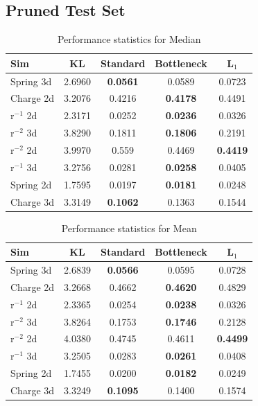 \documentclass[11pt]{article}
\begin{document}
\subsection{Pruned Test Set}
\begin{table}[h]
    \centering
    \begin{tabular}{lcccc}
    \hline
    Sim & KL & Standard & Bottleneck & L$_{1}$ \\
    \hline
    Spring 3d & 2.6960 & \textbf{0.0561} & 0.0589 & 0.0723 \\
    Charge 2d & 3.2076 & 0.4216 & \textbf{0.4178} & 0.4491 \\
    r$^{-1}$ 2d & 2.3171 & 0.0252 & \textbf{0.0236} & 0.0326 \\
    r$^{-2}$ 3d & 3.8290 & 0.1811 & \textbf{0.1806} & 0.2191 \\
    r$^{-2}$ 2d & 3.9970 & 0.559 & 0.4469 & \textbf{0.4419} \\
    r$^{-1}$ 3d & 3.2756 & 0.0281 & \textbf{0.0258} & 0.0405 \\
    Spring 2d & 1.7595 & 0.0197 & \textbf{0.0181} & 0.0248 \\
    Charge 3d & 3.3149 & \textbf{0.1062} & 0.1363 & 0.1544 \\
    \hline
    \end{tabular}
    \caption{Performance statistics for Median}
    \label{tab:Median}
    \end{table}

    \begin{table}[h]
        \centering
        \begin{tabular}{lcccc}
        \hline
        Sim & KL & Standard & Bottleneck & L$_{1}$ \\
        \hline
        Spring 3d & 2.6839 & \textbf{0.0566} & 0.0595 & 0.0728 \\
        Charge 2d & 3.2668 & 0.4662 & \textbf{0.4620} & 0.4829 \\
        r$^{-1}$ 2d & 2.3365 & 0.0254 & \textbf{0.0238} & 0.0326 \\
        r$^{-2}$ 3d & 3.8264 & 0.1753 & \textbf{0.1746} & 0.2128 \\
        r$^{-2}$ 2d & 4.0380 & 0.4745 & 0.4611 & \textbf{0.4499} \\
        r$^{-1}$ 3d & 3.2505 & 0.0283 & \textbf{0.0261} & 0.0408 \\
        Spring 2d & 1.7455 & 0.0200 & \textbf{0.0182} & 0.0249 \\
        Charge 3d & 3.3249 & \textbf{0.1095} & 0.1400 & 0.1574 \\
        \hline
        \end{tabular}
        \caption{Performance statistics for Mean}
        \label{tab:Mean}
        \end{table}
        
\end{document}
